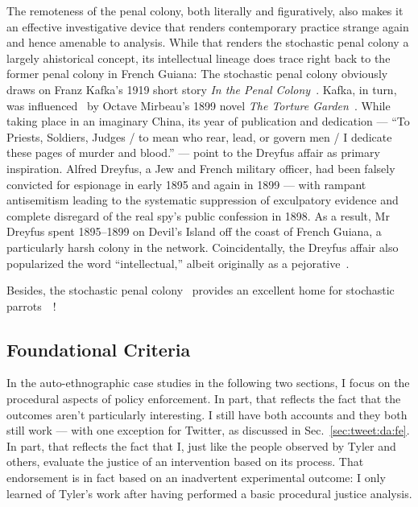 The remoteness of the penal colony, both literally and figuratively, also makes
it an effective investigative device that renders contemporary practice strange
again and hence amenable to analysis. While that renders the stochastic penal
colony a largely ahistorical concept, its intellectual lineage does trace right
back to the former penal colony in French Guiana: The stochastic penal colony
obviously draws on Franz Kafka's 1919 short story \emph{In the Penal
Colony}~\cite{Kafka1995}. Kafka, in turn, was influenced~\cite{Robertson2017} by
Octave Mirbeau's 1899 novel \emph{The Torture Garden}~\cite{Mirbeau2008}. While
taking place in an imaginary China, its year of publication and dedication ---
``To Priests, Soldiers, Judges / to mean who rear, lead, or govern men / I
dedicate these pages of murder and blood.'' --- point to the Dreyfus affair as
primary inspiration. Alfred Dreyfus, a Jew and French military officer, had been
falsely convicted for espionage in early 1895 and again in 1899 --- with rampant
antisemitism leading to the systematic suppression of exculpatory evidence and
complete disregard of the real spy's public confession in 1898. As a result, Mr
Dreyfus spent 1895--1899 on Devil's Island off the coast of French Guiana, a
particularly harsh colony in the network. Coincidentally, the Dreyfus affair
also popularized the word ``intellectual,'' albeit originally as a
pejorative~\cite{Drake2005,IntellectualsAndTheMediaInFrance2021}.

Besides, the stochastic penal colony~ provides an excellent
home for stochastic parrots~~\cite{BenderGebruea2021}!


\subsection{Foundational Criteria}
\label{sec:criteria}

In the auto-ethnographic case studies in the following two sections, I focus on
the procedural aspects of policy enforcement. In part, that reflects the fact
that the outcomes aren't particularly interesting. I still have both accounts
and they both still work — with one exception for Twitter, as discussed in Sec.\
\ref{sec:tweet:da:fe}. In part, that reflects the fact that I, just like the
people observed by Tyler and others, evaluate the justice of an intervention
based on its process. That endorsement is in fact based on an inadvertent
experimental outcome: I only learned of Tyler's work after having performed a
basic procedural justice analysis.

